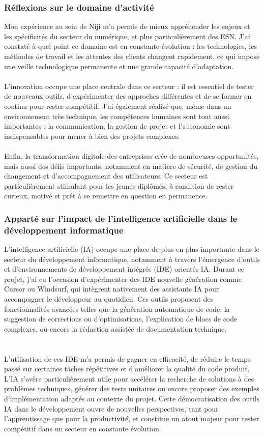 \documentclass[12pt]{article}
\begin{document}
\subsubsection{Réflexions sur le domaine d’activité}
Mon expérience au sein de Niji m’a permis de mieux appréhender les enjeux et les spécificités du secteur du numérique, et plus particulièrement des ESN. J’ai constaté à quel point ce domaine est en constante évolution : les technologies, les méthodes de travail et les attentes des clients changent rapidement, ce qui impose une veille technologique permanente et une grande capacité d’adaptation.
\\\\
L’innovation occupe une place centrale dans ce secteur : il est essentiel de tester de nouveaux outils, d’expérimenter des approches différentes et de se former en continu pour rester compétitif. J’ai également réalisé que, même dans un environnement très technique, les compétences humaines sont tout aussi importantes : la communication, la gestion de projet et l’autonomie sont indispensables pour mener à bien des projets complexes.
\\\\
Enfin, la transformation digitale des entreprises crée de nombreuses opportunités, mais aussi des défis importants, notamment en matière de sécurité, de gestion du changement et d’accompagnement des utilisateurs. Ce secteur est particulièrement stimulant pour les jeunes diplômés, à condition de rester curieux, motivé et prêt à se remettre en question en permanence.
\subsubsection{Apparté sur l'impact de l'intelligence artificielle dans le développement informatique}
L’intelligence artificielle (IA) occupe une place de plus en plus importante dans le secteur du développement informatique, notamment à travers l’émergence d’outils et d’environnements de développement intégrés (IDE) orientés IA. Durant ce projet, j’ai eu l’occasion d’expérimenter des IDE nouvelle génération comme Cursor ou Windsurf, qui intègrent nativement des assistants IA pour accompagner le développeur au quotidien. Ces outils proposent des fonctionnalités avancées telles que la génération automatique de code, la suggestion de corrections ou d’optimisations, l’explication de blocs de code complexes, ou encore la rédaction assistée de documentation technique.
\\\\\\
L’utilisation de ces IDE m’a permis de gagner en efficacité, de réduire le temps passé sur certaines tâches répétitives et d’améliorer la qualité du code produit. L’IA s’avère particulièrement utile pour accélérer la recherche de solutions à des problèmes techniques, générer des tests unitaires ou encore proposer des exemples d’implémentation adaptés au contexte du projet. Cette démocratisation des outils IA dans le développement ouvre de nouvelles perspectives, tant pour l’apprentissage que pour la productivité, et constitue un atout majeur pour rester compétitif dans un secteur en constante évolution.
\end{document}
